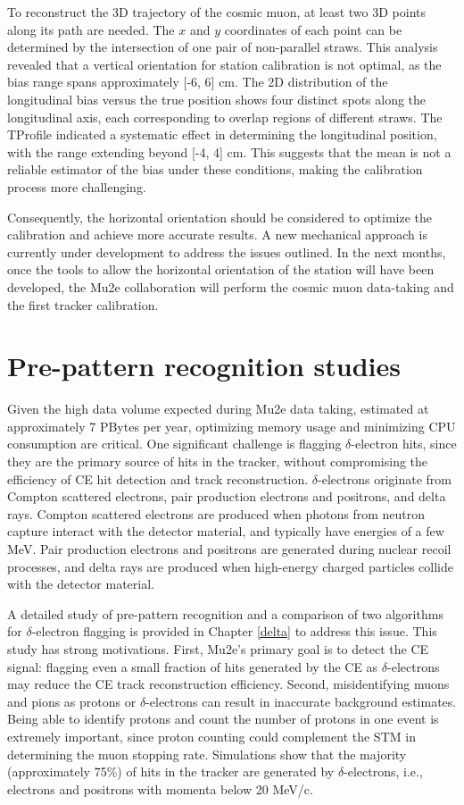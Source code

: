 To reconstruct the 3D trajectory of the cosmic muon, at least 
two 3D points along its path are needed. The $x$ and $y$ coordinates 
of each point can be determined by the intersection of one pair of 
non-parallel straws. This analysis revealed that a vertical orientation 
for station calibration is not optimal, as the bias range spans 
approximately [-6, 6] cm. 
The 2D distribution of the longitudinal bias versus the 
true position shows four 
distinct spots along the longitudinal axis, each corresponding 
to overlap regions of different straws. The TProfile indicated a systematic effect in determining 
the longitudinal position, with the range extending beyond [-4, 4] cm. 
This suggests that the mean is not a reliable estimator of the bias under 
these conditions, making the calibration process more challenging.

Consequently, the horizontal orientation should be considered to 
optimize the calibration and achieve more accurate results. A new 
mechanical approach is currently under development to address 
the issues outlined. 
In the next months, once the tools to allow the horizontal 
orientation of the station will have been developed, the Mu2e 
collaboration will perform the cosmic muon data-taking and the 
first tracker calibration. 
\section{Pre-pattern recognition studies}

Given the high data volume expected during Mu2e data taking, 
estimated at approximately 7 PBytes per year, optimizing memory usage 
and minimizing CPU consumption are critical. One significant challenge 
is flagging $\delta$-electron hits, since they are the primary source 
of hits in the tracker, without compromising the efficiency of 
CE hit detection and 
track reconstruction. $\delta$-electrons originate from Compton 
scattered electrons, 
pair production electrons and positrons, and delta rays. Compton 
scattered electrons 
are produced when photons from neutron capture interact with the 
detector material, and  
typically have energies of a few MeV. Pair production electrons 
and positrons 
are generated during nuclear recoil processes, and delta rays are produced 
when high-energy charged particles collide with the detector material.

A detailed study of pre-pattern recognition and a comparison of two 
algorithms for 
$\delta$-electron flagging is provided in Chapter \ref{delta} to 
address this issue. 
This study has strong motivations. First, Mu2e's 
primary goal is 
to detect the CE signal: flagging even a small fraction of hits generated 
by the CE as $\delta$-electrons may reduce the CE track 
reconstruction efficiency. 
Second, misidentifying muons and pions as protons or $\delta$-electrons 
can result in inaccurate background estimates. Being able to identify 
protons and count the number of protons in one event is extremely 
important, since proton counting could complement the STM in determining 
the muon stopping rate. 
Simulations show that the majority (approximately 75\%) of hits in 
the tracker 
are generated by $\delta$-electrons, i.e., electrons and positrons 
with momenta below 20 MeV/c.

